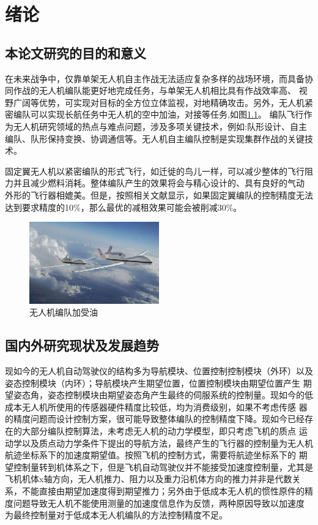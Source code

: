 \chapter{绪论}
\label{chap:intro}
\section{本论文研究的目的和意义}
在未来战争中，仅靠单架无人机自主作战无法适应复杂多样的战场环境，而具备协同作战的无人机编队能更好地完成任务，与单架无人机相比具有作战效率高、
视野广阔等优势，可实现对目标的全方位立体监视，对地精确攻击。另外，无人机紧密编队可以实现长航任务中无人机的空中加油，对接等任务,如图\ref{fig:c01-meaning-1}。
编队飞行作为无人机研究领域的热点与难点问题，涉及多项关键技术，例如:队形设计、自主编队、队形保持变换、协调通信等。无人机自主编队控制是实现集群作战的关键技
术。

固定翼无人机以紧密编队的形式飞行，如迁徙的鸟儿一样，可以减少整体的飞行阻力并且减少燃料消耗。整体编队产生的效果将会与精心设计的、具有良好的气动
外形的飞行器相媲美。但是，按照相关文献显示，如果固定翼编队的控制精度无法达到要求精度的10\%，那么最优的减租效果可能会被削减30\%。
\begin{figure}
  \centering
  \includegraphics[width=0.5\textwidth]{figures/c01-meaning-1}
  \caption{无人机编队加受油}\label{fig:c01-meaning-1}
 \end{figure}
\section{国内外研究现状及发展趋势}
现如今的无人机自动驾驶仪的结构多为导航模块、位置控制控制模块（外环）以及姿态控制模块（内环）；导航模块产生期望位置，位置控制模块由期望位置产生
期望姿态角，姿态控制模块由期望姿态角产生最终的伺服系统的控制量。现如今的低成本无人机所使用的传感器硬件精度比较低，均为消费级别，如果不考虑传感
器的精度问题而设计控制方案，很可能导致整体编队的控制精度下降。现如今已经存在的大部分编队控制算法，未考虑无人机的动力学模型，即只考虑飞机的质点
运动学以及质点动力学条件下提出的导航方法，最终产生的飞行器的控制量为无人机航迹坐标系下的加速度期望值。按照飞机的控制方式，需要将航迹坐标系下的
期望控制量转到机体系之下，但是飞机自动驾驶仪并不能接受加速度控制量，尤其是飞机机体x轴方向，无人机推力、阻力以及重力沿机体方向的推力并非是代数关
系，不能直接由期望加速度得到期望推力；另外由于低成本无人机的惯性原件的精度问题导致无人机不能使用测量的加速度信息作为反馈，两种原因导致以加速度
为最终控制量对于低成本无人机编队的方法控制精度不足。

